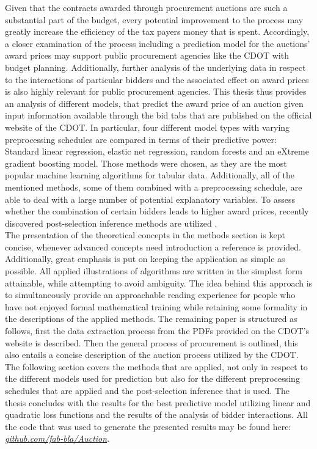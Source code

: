 \documentclass[a4paper,12pt, headsepline]{scrartcl}
\numberwithin{equation}{section}
\begin{document}
Given that the contracts awarded through procurement auctions are such a substantial part of the budget, every potential improvement to the process may greatly increase the efficiency of the tax payers money that is spent. Accordingly, a closer examination of the process including a prediction model for the auctions' award prices may support public procurement agencies like the CDOT with budget planning. Additionally, further analysis of the underlying data in respect to the interactions of particular bidders and the associated effect on award prices is also highly relevant for public procurement agencies. This thesis thus provides an analysis of different models, that predict the award price of an auction given input information available through the bid tabs that are published on the official website of the CDOT. In particular, four different model types with varying preprocessing schedules are compared in terms of their predictive power: Standard linear regression, elastic net regression, random forests and an eXtreme gradient boosting model. Those methods were chosen, as they are the most popular machine learning algorithms for tabular data. Additionally, all of the mentioned methods, some of them combined with a preprocessing schedule, are able to deal with a large number of potential explanatory variables. To assess whether the combination of certain bidders leads to higher award prices, recently discovered post-selection inference methods are utilized \citep{selectiveInference}.\\
The presentation of the theoretical concepts in the methods section is kept concise, whenever advanced concepts need introduction a reference is provided. Additionally, great emphasis is put on keeping the application as simple as possible. All applied illustrations of algorithms are written in the simplest form attainable, while attempting to avoid ambiguity. The idea behind this approach is to simultaneously provide an approachable reading experience for people who have not enjoyed formal mathematical training while retaining some formality in the descriptions of the applied methods.
The remaining paper is structured as follows, first the data extraction process from the PDFs provided on the CDOT's website is described. Then the general process of procurement is outlined, this also entails a concise description of the auction process utilized by the CDOT. The following section covers the methods that are applied, not only in respect to the different models used for prediction but also for the different preprocessing schedules that are applied and the post-selection inference that is used. The thesis concludes with the results for the best predictive model utilizing linear and quadratic loss functions and the results of the analysis of bidder interactions. All the code that was used to generate the presented results may be found here: \href{https://github.com/fab-bla/Auction}{\textit{github.com/fab-bla/Auction}}.
\newpage
\end{document}
